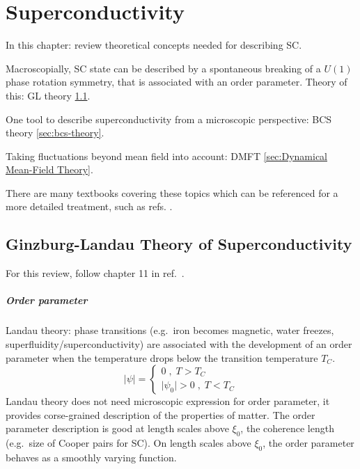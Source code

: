 \documentclass[../notes.tex]{subfiles}
\begin{document}
\chapter{Superconductivity}

In this chapter: review theoretical concepts needed for describing SC. 

Macroscopially, SC state can be described by a spontaneous breaking of a \(U(1)\) phase rotation symmetry, that is associated with an order parameter. 
Theory of this: GL theory \cref{sec:Ginzburg-Landau theory of superconductivity}.

One tool to describe superconductivity from a microscopic perspective: BCS theory \cref{sec:bcs-theory}.

Taking fluctuations beyond mean field into account: DMFT \cref{sec:Dynamical Mean-Field Theory}.

There are many textbooks covering these topics which can be referenced for a more detailed treatment, such as refs. \cite{colemanIntroductionManyBodyPhysics2015, tinkhamIntroductionSuperconductivity1996, bruusManyBodyQuantumTheory2004, larkinTheoryFluctuationsSuperconductors2005}.

\section{Ginzburg-Landau Theory of Superconductivity}\label{sec:Ginzburg-Landau theory of superconductivity}

For this review, follow chapter 11 in ref.~\cite{colemanIntroductionManyBodyPhysics2015}.



\paragraph{Order parameter}

\cite{landauTheorySuperconductivity1965}

Landau theory: phase transitions (e.g.\ iron becomes magnetic, water freezes, superfluidity/superconductivity) are associated with the development of an order parameter when the temperature drops below the transition temperature \(T_C\).
\begin{equation}
	\vert \psi \vert =
	\begin{cases}
		0\;,\; T > T_C \\
		\vert \psi_0 \vert > 0 \;,\; T < T_C
	\end{cases}
\end{equation}
Landau theory does not need microscopic expression for order parameter, it provides corse-grained description of the properties of matter.
The order parameter description is good at length scales above \(\xi_0\), the coherence length (e.g.\ size of Cooper pairs for SC).
On length scales above \(\xi_0\), the order parameter behaves as a smoothly varying function.
\end{document}
